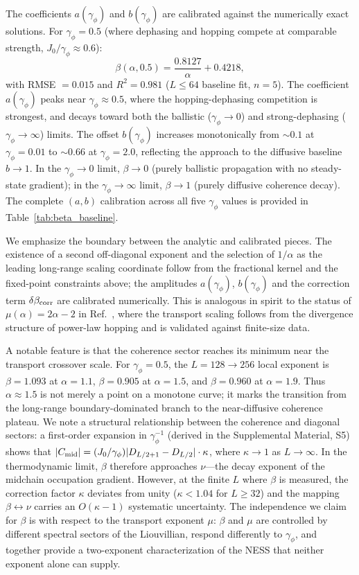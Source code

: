 \documentclass[aps,prd,twocolumn,superscriptaddress,floatfix]{revtex4-2}
\begin{document}
The coefficients $a(\gamma_\phi)$ and $b(\gamma_\phi)$ are calibrated
against the numerically exact solutions. For $\gamma_\phi = 0.5$
(where dephasing and hopping compete at comparable strength,
$J_0/\gamma_\phi \approx 0.6$):
\begin{equation}
\beta(\alpha, 0.5) = \frac{0.8127}{\alpha} + 0.4218,
\label{eq:beta_fit}
\end{equation}
with RMSE $= 0.015$ and $R^2 = 0.981$ ($L\leq 64$ baseline fit,
$n=5$). The coefficient $a(\gamma_\phi)$ peaks near
$\gamma_\phi \approx 0.5$, where the hopping-dephasing competition is
strongest, and decays toward both the ballistic ($\gamma_\phi \to 0$)
and strong-dephasing ($\gamma_\phi \to \infty$) limits. The offset
$b(\gamma_\phi)$ increases monotonically from $\sim 0.1$ at
$\gamma_\phi = 0.01$ to $\sim 0.66$ at $\gamma_\phi = 2.0$,
reflecting the approach to the diffusive baseline $b \to 1$. In the
$\gamma_\phi \to 0$ limit, $\beta \to 0$ (purely ballistic propagation
with no steady-state gradient); in the $\gamma_\phi \to \infty$ limit,
$\beta \to 1$ (purely diffusive coherence decay). The complete
$(a, b)$ calibration across all five $\gamma_\phi$ values is provided
in Table~\ref{tab:beta_baseline}.

We emphasize the boundary between the analytic and calibrated pieces.
The existence of a second off-diagonal exponent and the selection of
$1/\alpha$ as the leading long-range scaling coordinate follow from
the fractional kernel and the fixed-point constraints above; the
amplitudes $a(\gamma_\phi)$, $b(\gamma_\phi)$ and the correction term
$\delta\beta_{\rm corr}$ are calibrated numerically. This is analogous
in spirit to the status of $\mu(\alpha) = 2\alpha-2$ in
Ref.~\cite{Dhawan2024}, where the transport scaling follows from the
divergence structure of power-law hopping and is validated against
finite-size data.

A notable feature is that the coherence sector reaches its minimum
near the transport crossover scale. For $\gamma_\phi = 0.5$, the
$L{=}128{\to}256$ local exponent is $\beta = 1.093$ at $\alpha = 1.1$,
$\beta = 0.905$ at $\alpha = 1.5$, and $\beta = 0.960$ at
$\alpha = 1.9$. Thus $\alpha \approx 1.5$ is not merely a point on a
monotone curve; it marks the transition from the long-range
boundary-dominated branch to the near-diffusive coherence plateau. We
note a structural relationship between the coherence and diagonal
sectors: a first-order expansion in $\gamma_\phi^{-1}$ (derived in the
Supplemental Material, S5) shows that
$|C_{\rm mid}| = (J_0/\gamma_\phi)|D_{L/2+1} - D_{L/2}|\cdot\kappa$,
where $\kappa \to 1$ as $L\to\infty$. In the thermodynamic limit,
$\beta$ therefore approaches $\nu$---the decay exponent of the
midchain occupation gradient. However, at the finite $L$ where
$\beta$ is measured, the correction factor $\kappa$ deviates from
unity ($\kappa < 1.04$ for $L \geq 32$) and the mapping
$\beta \leftrightarrow \nu$ carries an $O(\kappa-1)$ systematic
uncertainty. The independence we claim for $\beta$ is with respect to
the transport exponent $\mu$: $\beta$ and $\mu$ are controlled by
different spectral sectors of the Liouvillian, respond differently to
$\gamma_\phi$, and together provide a two-exponent characterization of
the NESS that neither exponent alone can supply.
\end{document}
